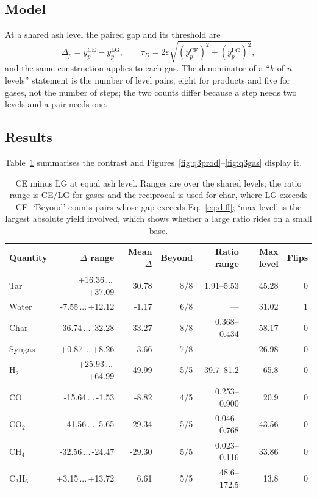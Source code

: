 \documentclass[withoutpreface,bwprint]{apmcmthesis}
\begin{document}
\subsection{Model}
At a shared ash level the paired gap and its threshold are
\begin{equation}
\Delta_p=y_p^{\mathrm{CE}}-y_p^{\mathrm{LG}},\qquad
\tau_{D}=2\varepsilon\sqrt{(y_p^{\mathrm{CE}})^2+(y_p^{\mathrm{LG}})^2},
\label{eq:delta}
\end{equation}
and the same construction applies to each gas. The denominator of a ``$k$ of $n$ levels'' statement is the number of level pairs, eight for products and five for gases, not the number of steps; the two counts differ because a step needs two levels and a pair needs one.

\subsection{Results}
Table~\ref{tab:q3} summarises the contrast and Figures~\ref{fig:q3prod}--\ref{fig:q3gas} display it.

\begin{table}[htbp]\centering
\caption{CE minus LG at equal ash level. Ranges are over the shared levels; the ratio range is CE/LG for gases and the reciprocal is used for char, where LG exceeds CE. `Beyond' counts pairs whose gap exceeds Eq.~\eqref{eq:diff}; `max level' is the largest absolute yield involved, which shows whether a large ratio rides on a small base.}
\label{tab:q3}
{\small\setlength{\tabcolsep}{1.9pt}
\begin{tabular}{@{}lrrrrrr@{}}
\toprule
Quantity & $\Delta$ range & Mean $\Delta$ & Beyond & Ratio range & Max level & Flips\\
\midrule
Tar & +16.36\,...\,+37.09 & 30.78 & 8/8 & 1.91--5.53 & 45.28 & 0\\
Water & -7.55\,...\,+12.12 & -1.17 & 6/8 & --- & 31.02 & 1\\
Char & -36.74\,...\,-32.28 & -33.27 & 8/8 & 0.368--0.434 & 58.17 & 0\\
Syngas & +0.87\,...\,+8.26 & 3.66 & 7/8 & --- & 26.98 & 0\\
H$_2$ & +25.93\,...\,+64.99 & 49.99 & 5/5 & 39.7--81.2 & 65.8 & 0\\
CO & -15.64\,...\,-1.53 & -8.82 & 4/5 & 0.253--0.900 & 20.9 & 0\\
CO$_2$ & -41.56\,...\,-5.65 & -29.34 & 5/5 & 0.046--0.768 & 43.56 & 0\\
CH$_4$ & -32.56\,...\,-24.47 & -29.30 & 5/5 & 0.023--0.116 & 33.86 & 0\\
C$_2$H$_6$ & +3.15\,...\,+13.72 & 6.61 & 5/5 & 48.6--172.5 & 13.8 & 0\\
\bottomrule
\end{tabular}}
\end{table}
\end{document}
